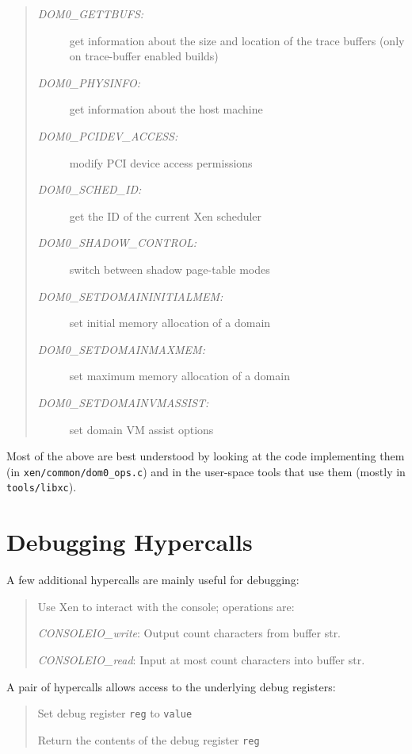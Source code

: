 \documentclass[11pt,twoside,final,openright]{report}
\begin{document}
\begin{quote}
\begin{description}
\item [\it DOM0\_GETTBUFS:] get information about the size and location of
                      the trace buffers (only on trace-buffer enabled builds)

\item [\it DOM0\_PHYSINFO:] get information about the host machine

\item [\it DOM0\_PCIDEV\_ACCESS:] modify PCI device access permissions

\item [\it DOM0\_SCHED\_ID:] get the ID of the current Xen scheduler

\item [\it DOM0\_SHADOW\_CONTROL:] switch between shadow page-table modes

\item [\it DOM0\_SETDOMAININITIALMEM:] set initial memory allocation of a domain

\item [\it DOM0\_SETDOMAINMAXMEM:] set maximum memory allocation of a domain

\item [\it DOM0\_SETDOMAINVMASSIST:] set domain VM assist options
\end{description} 
\end{quote} 

Most of the above are best understood by looking at the code 
implementing them (in {\tt xen/common/dom0\_ops.c}) and in 
the user-space tools that use them (mostly in {\tt tools/libxc}). 

\section{Debugging Hypercalls} 

A few additional hypercalls are mainly useful for debugging: 

\begin{quote} 

Use Xen to interact with the console; operations are:

{\it CONSOLEIO\_write}: Output count characters from buffer str.

{\it CONSOLEIO\_read}: Input at most count characters into buffer str.
\end{quote} 

A pair of hypercalls allows access to the underlying debug registers: 
\begin{quote}

Set debug register {\tt reg} to {\tt value} 


Return the contents of the debug register {\tt reg}
\end{quote}
\end{document}
